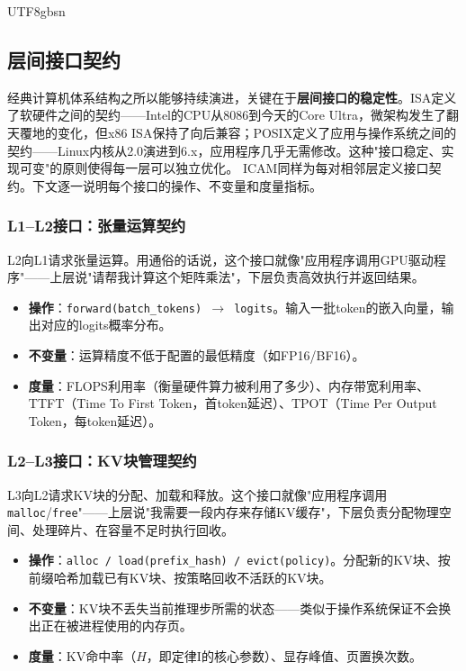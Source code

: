 \documentclass[11pt,a4paper]{article}
\begin{document}
\begin{CJK*}{UTF8}{gbsn}
\subsection{层间接口契约}
\label{sec:icam-interfaces}

经典计算机体系结构之所以能够持续演进，关键在于\textbf{层间接口的稳定性}。ISA定义了软硬件之间的契约——Intel的CPU从8086到今天的Core Ultra，微架构发生了翻天覆地的变化，但x86 ISA保持了向后兼容；POSIX定义了应用与操作系统之间的契约——Linux内核从2.0演进到6.x，应用程序几乎无需修改。这种"接口稳定、实现可变"的原则使得每一层可以独立优化。
ICAM同样为每对相邻层定义接口契约。下文逐一说明每个接口的操作、不变量和度量指标。

\subsubsection{L1--L2接口：张量运算契约}

L2向L1请求张量运算。用通俗的话说，这个接口就像"应用程序调用GPU驱动程序"——上层说"请帮我计算这个矩阵乘法"，下层负责高效执行并返回结果。

\begin{itemize}[nosep]
\item \textbf{操作}：\texttt{forward(batch\_tokens) $\to$ logits}。输入一批token的嵌入向量，输出对应的logits概率分布。
\item \textbf{不变量}：运算精度不低于配置的最低精度（如FP16/BF16）。
\item \textbf{度量}：FLOPS利用率（衡量硬件算力被利用了多少）、内存带宽利用率、TTFT（Time To First Token，首token延迟）、TPOT（Time Per Output Token，每token延迟）。
\end{itemize}

\subsubsection{L2--L3接口：KV块管理契约}

L3向L2请求KV块的分配、加载和释放。这个接口就像"应用程序调用\texttt{malloc}/\texttt{free}"——上层说"我需要一段内存来存储KV缓存"，下层负责分配物理空间、处理碎片、在容量不足时执行回收。

\begin{itemize}[nosep]
\item \textbf{操作}：\texttt{alloc / load(prefix\_hash) / evict(policy)}。分配新的KV块、按前缀哈希加载已有KV块、按策略回收不活跃的KV块。
\item \textbf{不变量}：KV块不丢失当前推理步所需的状态——类似于操作系统保证不会换出正在被进程使用的内存页。
\item \textbf{度量}：KV命中率（$H$，即定律I的核心参数）、显存峰值、页置换次数。
\end{itemize}


\end{CJK*}
\end{document}
